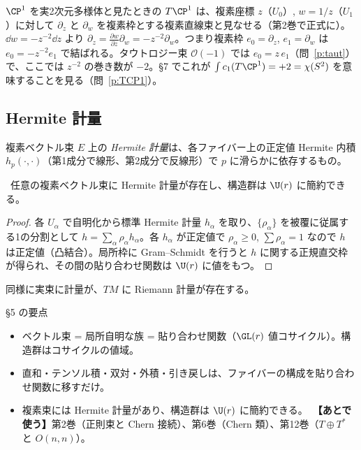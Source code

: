 \begin{ex}[$T\CP^1$ の貼り合わせ関数]\label{ex:TCP1}
$\CP^1$ を実2次元多様体と見たときの $T\CP^1$ は、複素座標 $z$（$U_0$）, $w=1/z$（$U_1$）に対して $\partial_z$ と $\partial_w$ を複素枠とする複素直線束と見なせる（第2巻で正式に）。$\dd w=-z^{-2}\dd z$ より $\partial_z=\frac{\partial w}{\partial z}\partial_w=-z^{-2}\partial_w$。つまり複素枠 $e_0=\partial_z$, $e_1=\partial_w$ は $e_0=-z^{-2}e_1$ で結ばれる。タウトロジー束 $\mathcal O(-1)$ では $e_0=z\,e_1$（問~\ref{p:taut}）で、ここでは $z^{-2}$ の巻き数が $-2$。§7 でこれが $\int c_1(T\CP^1)=+2=\chi(S^2)$ を意味することを見る（問~\ref{p:TCP1}）。
\end{ex}

\subsection{Hermite 計量}
\begin{defn}
複素ベクトル束 $E$ 上の \emph{Hermite 計量}は、各ファイバー上の正定値 Hermite 内積 $h_p(\cdot,\cdot)$（第1成分で線形、第2成分で反線形）で $p$ に滑らかに依存するもの。
\end{defn}
\begin{prop}\label{prop:herm}\tP\
任意の複素ベクトル束に Hermite 計量が存在し、構造群は $\U(r)$ に簡約できる。
\end{prop}
\begin{proof}
各 $U_\alpha$ で自明化から標準 Hermite 計量 $h_\alpha$ を取り、$\{\rho_\alpha\}$ を被覆に従属する1の分割として $h=\sum_\alpha\rho_\alpha h_\alpha$。各 $h_\alpha$ が正定値で $\rho_\alpha\ge0$, $\sum\rho_\alpha=1$ なので $h$ は正定値（凸結合）。局所枠に Gram--Schmidt を行うと $h$ に関する正規直交枠が得られ、その間の貼り合わせ関数は $\U(r)$ に値をもつ。
\end{proof}
同様に実束に計量が、$TM$ に Riemann 計量が存在する。

\begin{keybox}{§5 の要点}
\begin{itemize}
\item ベクトル束 = 局所自明な族 = 貼り合わせ関数（$\GL(r)$ 値コサイクル）。構造群はコサイクルの値域。
\item 直和・テンソル積・双対・外積・引き戻しは、ファイバーの構成を貼り合わせ関数に移すだけ。
\item 複素束には Hermite 計量があり、構造群は $\U(r)$ に簡約できる。\ \textbf{【あとで使う】}第2巻（正則束と Chern 接続）、第6巻（Chern 類）、第12巻（$T\oplus T^*$ と $O(n,n)$）。
\end{itemize}
\end{keybox}

